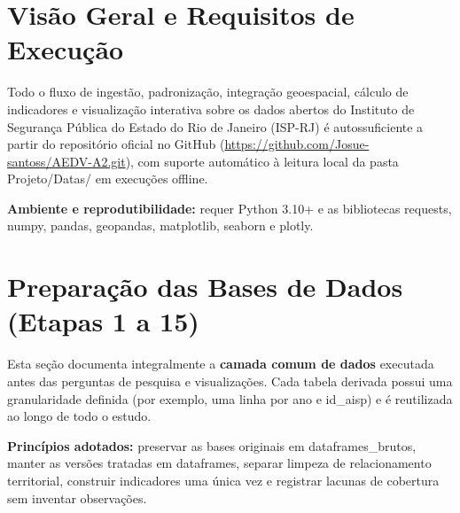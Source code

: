 \documentclass[11pt,a4paper]{article}
\newcommand{\code}[1]{{\ttfamily\footnotesize\allowbreak #1}}
\begin{document}
\begin{abstract}
Esta documentação descreve a arquitetura computacional, o pipeline completo de preparação e tratamento de dados, as decisões metodológicas de código e de design visual e a referência integral das 13 funções implementadas no projeto.
\end{abstract}

\tableofcontents
\vspace{8pt}

\section{Visão Geral e Requisitos de Execução}

Todo o fluxo de ingestão, padronização, integração geoespacial, cálculo de indicadores e visualização interativa sobre os dados abertos do Instituto de Segurança Pública do Estado do Rio de Janeiro (ISP-RJ) é autossuficiente a partir do repositório oficial no GitHub (\url{https://github.com/Josue-santoss/AEDV-A2.git}), com suporte automático à leitura local da pasta \code{Projeto/Datas/} em execuções offline.

\textbf{Ambiente e reprodutibilidade:} requer Python 3.10+ e as bibliotecas \code{requests}, \code{numpy}, \code{pandas}, \code{geopandas}, \code{matplotlib}, \code{seaborn} e \code{plotly}. 

\section{Preparação das Bases de Dados (Etapas 1 a 15)}

Esta seção documenta integralmente a \textbf{camada comum de dados} executada antes das perguntas de pesquisa e visualizações. Cada tabela derivada possui uma granularidade definida (por exemplo, uma linha por \code{ano} e \code{id\_aisp}) e é reutilizada ao longo de todo o estudo.

\textbf{Princípios adotados:} preservar as bases originais em \code{dataframes\_brutos}, manter as versões tratadas em \code{dataframes}, separar limpeza de relacionamento territorial, construir indicadores uma única vez e registrar lacunas de cobertura sem inventar observações.
\end{document}
